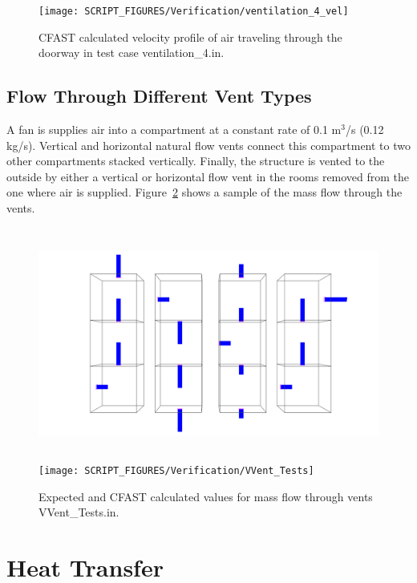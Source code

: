 \begin{figure}[!ht]
\centering
\texttt{[image: SCRIPT\_FIGURES/Verification/ventilation\_4\_vel]}
\caption[Results of the test case {\ct ventilation\_4.in}]{CFAST calculated velocity profile of air traveling through the doorway in test case {\ct ventilation\_4.in}.}
\label{fig:vel}
\end{figure}

\subsection{Flow Through Different Vent Types}
\label{VVent_Tests}

A fan is supplies air into a compartment at a constant rate of 0.1 m$^3$/s (0.12 kg/s). Vertical and horizontal natural flow vents connect this compartment to two other compartments stacked vertically.  Finally, the structure is vented to the outside by either a vertical or horizontal flow vent in the rooms removed from the one where air is supplied. Figure~\ref{fig:vvent} shows a sample of the mass flow through the vents.

\begin{figure}
\begin{center}
\includegraphics[height=3.0in]{FIGURES/Verification/VVent_Geom} \\
\texttt{[image: SCRIPT\_FIGURES/Verification/VVent\_Tests]}
\end{center}
\caption[Results of the test case {\ct VVent\_Tests.in}]{Expected and CFAST calculated values for mass flow through vents {\ct VVent\_Tests.in}.}
\label{fig:vvent}
\end{figure}

\section{Heat Transfer}
\label{radiation}

